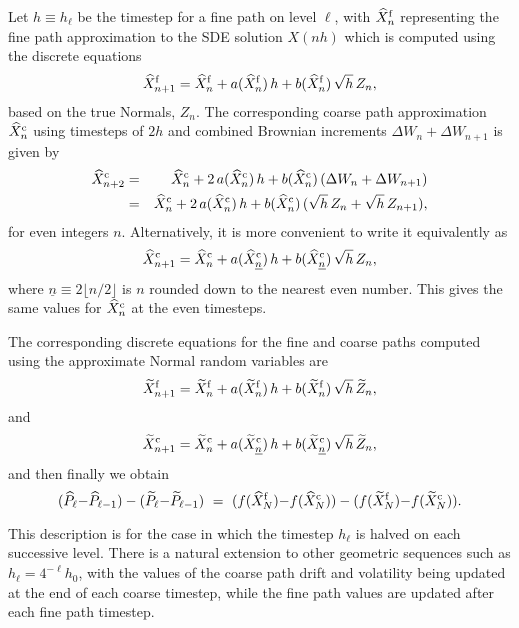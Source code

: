 \documentclass[review]{siamart190516}
\def \tP {{\widetilde{P}}}
\def \tZ {{\widetilde{Z}}}
\def \tXfnp {{\widetilde{X}^{\rm f}_{n+1}}}
\def \tXcnp {{\widetilde{X}^{\rm c}_{n+1}}}
\def \tXfn {{\widetilde{X}^{\rm f}_n}}
\def \tXf  {{\widetilde{X}^{\rm f}}}
\def \tXcn {{\widetilde{X}^{\rm c}_n}}
\def \tXc  {{\widetilde{X}^{\rm c}}}
\def \tXcl {{\widetilde{X}^{\rm c}_{\underline{n}}}}
\def \hP {{\widehat{P}}}
\def \hXfnp {{\widehat{X}^{\rm f}_{n+1}}}
\def \hXcnp {{\widehat{X}^{\rm c}_{n+1}}}
\def \hXcpp {{\widehat{X}^{\rm c}_{n+2}}}
\def \hXfn {{\widehat{X}^{\rm f}_n}}
\def \hXf {{\widehat{X}^{\rm f}}}
\def \hXcn {{\widehat{X}^{\rm c}_n}}
\def \hXc {{\widehat{X}^{\rm c}}}
\def \hXcl {{\widehat{X}^{\rm c}_{\underline{n}}}}
\begin{document}
Let $h\equiv h_\ell$ be the timestep for a fine path on level $\ell$,
with $\hXfn$ representing the fine path approximation to the SDE
solution $X(nh)$ which is computed using the discrete equations
\begin{equation}
\hXfnp = \hXfn + a(\hXfn)\, h + b(\hXfn)\, \sqrt{h}\, Z_n,
\label{eq:hf}
\end{equation}
based on the true Normals, $Z_n$.  The corresponding coarse path 
approximation $\hXcn$ using timesteps of $2h$ and combined
Brownian increments $\Delta W_n {+} \Delta W_{n+1}$ is given by 
\begin{eqnarray*}
\hXcpp
   &=& \hXcn + 2\, a(\hXcn)\, h + b(\hXcn)\, (\Delta W_n + \Delta W_{n+1})
\\ &=& \hXcn + 2\, a(\hXcn)\, h + b(\hXcn)\, (\sqrt{h}\, Z_n + \sqrt{h}\, Z_{n+1}),
\end{eqnarray*}
for even integers $n$.  Alternatively, it is more convenient 
to write it equivalently as
\begin{equation}
\hXcnp = \hXcn + a(\hXcl)\, h + b(\hXcl)\, \sqrt{h}\, Z_n,
\label{eq:hc}
\end{equation}
where $\underline{n} \equiv 2 \lfloor n/2 \rfloor$ is $n$ rounded 
down to the nearest even number. This gives the same values 
for $\hXcn$ at the even timesteps.

The corresponding discrete equations for the fine and coarse paths 
computed using the approximate Normal random variables are
\begin{equation}
\tXfnp = \tXfn + a(\tXfn)\, h + b(\tXfn)\, \sqrt{h}\, \tZ_n,
\label{eq:tf}
\end{equation}
and
\begin{equation}
\tXcnp = \tXcn + a(\tXcl)\, h + b(\tXcl)\, \sqrt{h}\, \tZ_n,
\label{eq:tc}
\end{equation}
and then finally we obtain
\[
(\hP_\ell {-} \hP_{\ell-1}) - (\tP_\ell {-} \tP_{\ell-1})
  \ =\ 
(f(\hXf_N) {-} f(\hXc_N)) -  (f(\tXf_N) {-} f(\tXc_N)).
\]

This description is for the case in which the timestep $h_\ell$ is halved
on each successive level.  There is a natural extension to other geometric
sequences such as $h_\ell = 4^{-\ell} h_0$, with the values of the coarse path 
drift and volatility being updated at the end of each coarse timestep, while
the fine path values are updated after each fine path timestep.

\end{document}
